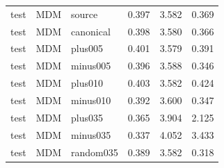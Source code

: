 \begin{table}[t]
\begin{tabular}{lllrrr}
test&MDM&source&0.397&3.582&0.369\\
test&MDM&canonical&0.398&3.580&0.366\\
test&MDM&plus005&0.401&3.579&0.391\\
test&MDM&minus005&0.396&3.588&0.346\\
test&MDM&plus010&0.403&3.582&0.424\\
test&MDM&minus010&0.392&3.600&0.347\\
test&MDM&plus035&0.365&3.904&2.125\\
test&MDM&minus035&0.337&4.052&3.433\\
test&MDM&random035&0.389&3.582&0.318\\
\bottomrule\end{tabular}\end{table}
